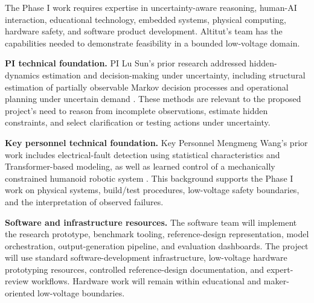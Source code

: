 
The Phase I work requires expertise in uncertainty-aware reasoning, human-AI interaction, educational technology, embedded systems, physical computing, hardware safety, and software product development. Altitut's team has the capabilities needed to demonstrate feasibility in a bounded low-voltage domain.

\textbf{PI technical foundation.} PI Lu Sun's prior research addressed hidden-dynamics estimation and decision-making under uncertainty, including structural estimation of partially observable Markov decision processes and operational planning under uncertain demand \cite{chang2023pomdp,chang2021uniform}. These methods are relevant to the proposed project's need to reason from incomplete observations, estimate hidden constraints, and select clarification or testing actions under uncertainty.

\textbf{Key personnel technical foundation.} Key Personnel Mengmeng Wang's prior work includes electrical-fault detection using statistical characteristics and Transformer-based modeling, as well as learned control of a mechanically constrained humanoid robotic system \cite{chen2022incipient,hu2026lipmotions}. This background supports the Phase I work on physical systems, build/test procedures, low-voltage safety boundaries, and the interpretation of observed failures.

\textbf{Software and infrastructure resources.} The software team will implement the research prototype, benchmark tooling, reference-design representation, model orchestration, output-generation pipeline, and evaluation dashboards. The project will use standard software-development infrastructure, low-voltage hardware prototyping resources, controlled reference-design documentation, and expert-review workflows. Hardware work will remain within educational and maker-oriented low-voltage boundaries.

